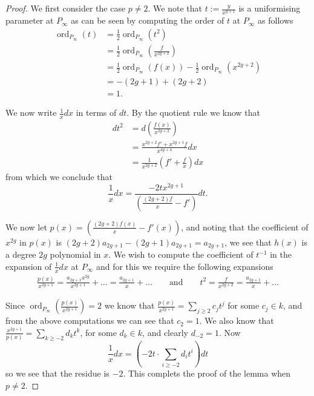 \documentclass[draft, 11pt]{article} %
\theoremstyle{plain}
\theoremstyle{remark}
\DeclareMathOperator{\ord}{ord}
\begin{document}
\begin{proof}

We first consider the case $p\neq 2$.
We note that $t:= \frac{y}{x^{g+1}}$ is a uniformising parameter at $P_\infty$ as can be seen by computing the order of $t$ at $P_\infty$ as follows
\begin{align}
\ord_{P_\infty}(t) & =  \frac{1}{2}\ord_{P_\infty}(t^2) \\
  & =  \frac{1}{2}\ord_{P_\infty}\left( \frac{f}{x^{2g+2}} \right) \\
& =  \frac{1}{2}\ord_{P_\infty}(f(x)) - \frac{1}{2}\ord_{P_\infty}(x^{2g+2})\\
& =  -(2g+1) + (2g+2) \\
& =  1.
\end{align}

We now write $\frac{1}{x}dx$ in terms of $dt$.
By the quotient rule we know that
\begin{align*}
dt^2 & =  d \left( \frac{f(x)}{x^{2g+2}} \right) \\
& =  \frac{x^{2g+2}f' + x^{2g+1}f}{x^{4g+4}} dx \\
& =  \frac{1}{x^{2g+2}} \left( f' + \frac{f}{x} \right) dx
\end{align*}
from which we conclude that
\[
\frac{1}{x}dx = \frac{-2tx^{2g+1}}{\left(\frac{(2g+2)f}{x} - f'\right)} dt.
\]


We now let $p(x) = \left(\frac{(2g+2)f(x)}{x} - f'(x)\right)$, and noting that the coefficient of $x^{2g}$ in $p(x)$ is $(2g+2)a_{2g+1} - (2g+1)a_{2g+1} = a_{2g+1}$, we see that $h(x)$ is a degree $2g$ polynomial in $x$.
We wish to compute the coefficient of $t^{-1}$ in the expansion of $\frac{1}{x}dx$ at $P_\infty$ and for this we require the following expansions
\begin{align}
\frac{p(x)}{x^{2g+1}} = \frac{a_{2g+1}x^{2g}}{x^{2g+1}} + \ldots = \frac{a_{2g+1}}{x} + \ldots \qquad \text{and} \qquad t^2 = \frac{f}{x^{2g+2} } = \frac{a_{2g+1}}{x} + \ldots
\end{align}

Since $\ord_{P_\infty}\left(\frac{p(x)}{x^{2g+1}}\right) = 2$ we know that $\frac{p(x)}{x^{2g+1}} = \sum_{j\geq 2} c_j t^j$ for some $c_j\in k$, and from the above computations we can see that $c_2 = 1$.
We also know that $\frac{x^{2g+1}}{p(x)} = \sum_{k\geq -2} d_kt^k$, for some $d_k\in k$, and clearly $d_{-2} = 1$.
Now
\[
\frac{1}{x}dx = \left( -2t \cdot \sum_{i\geq -2} d_it^i\right) dt 
\]
so we see that the residue is $-2$.
This complets the proof of the lemma when $p\neq 2$.


\end{proof}
\end{document}
